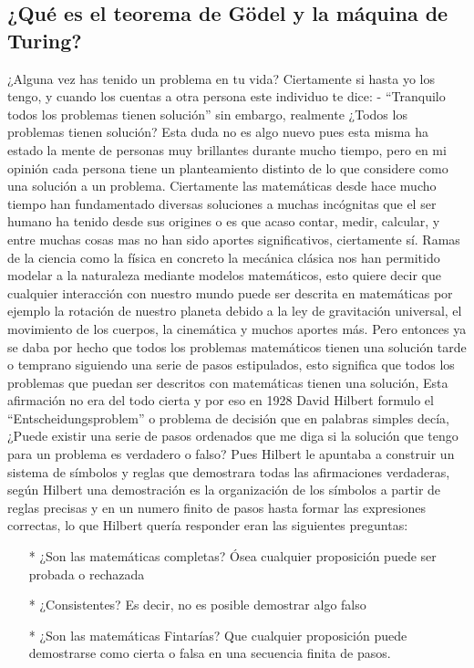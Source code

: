 \documentclass{article}
\begin{document}
\subsection{¿Qué es el teorema de Gödel y la máquina de Turing?}
\par
¿Alguna vez has tenido un problema en tu vida? Ciertamente si hasta yo los tengo, y cuando los cuentas a otra persona este individuo te dice: - “Tranquilo todos los problemas tienen solución” sin embargo, realmente ¿Todos los problemas tienen solución? Esta duda no es algo nuevo pues esta misma ha estado la mente de personas muy brillantes durante mucho tiempo, pero en mi opinión cada persona tiene un planteamiento distinto de lo que considere como una solución a un problema. 
Ciertamente las matemáticas desde hace mucho tiempo han fundamentado diversas soluciones a muchas incógnitas que el ser humano ha tenido desde sus origines o es que acaso contar, medir, calcular, y entre muchas cosas mas no han sido aportes significativos, ciertamente sí. Ramas de la ciencia como la física en concreto la mecánica clásica nos han permitido modelar a la naturaleza mediante modelos matemáticos, esto quiere decir que cualquier interacción con nuestro mundo puede ser descrita en matemáticas por ejemplo la rotación de nuestro planeta debido a la ley de gravitación universal, el movimiento de los cuerpos, la cinemática y muchos aportes más. Pero entonces ya se daba por hecho que todos los problemas matemáticos tienen una solución tarde o temprano siguiendo una serie de pasos estipulados, esto significa que todos los problemas que puedan ser descritos con matemáticas tienen una solución, Esta afirmación no era del todo cierta y por eso en 1928 David Hilbert formulo el “Entscheidungsproblem” o problema de decisión que en palabras simples decía, ¿Puede existir una serie de pasos ordenados que me diga si la solución que tengo para un problema es verdadero o falso? Pues Hilbert le apuntaba a construir un sistema de símbolos y reglas que demostrara todas las afirmaciones verdaderas, según Hilbert una demostración es la organización de los símbolos a partir de reglas precisas y en un numero finito de pasos hasta formar las expresiones correctas, lo que Hilbert quería responder eran las siguientes preguntas: 

\par
\vspace{4mm}
\begin{enumerate}
    \item [*]¿Son las matemáticas completas? Ósea cualquier proposición puede ser probada o rechazada 
    \item [*]¿Consistentes? Es decir, no es posible demostrar algo falso 
    \item [*]¿Son las matemáticas Fintarías? Que cualquier proposición puede demostrarse como cierta o falsa en una secuencia finita de pasos.
\end{enumerate}
\end{document}
